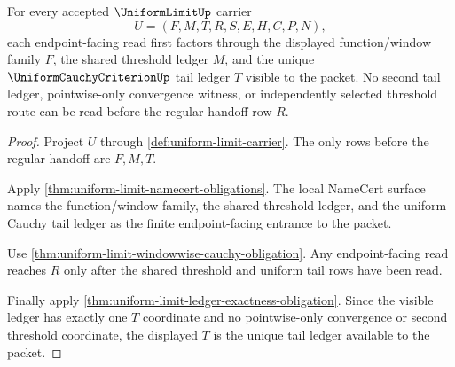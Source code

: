 \begin{theorem}
\label{thm:uniform-limit-tail-ledger-exactness}
For every accepted $\UniformLimitUp$ carrier
$$
U=(F,M,T,R,S,E,H,C,P,N),
$$
each endpoint-facing read first factors through the displayed function/window family $F$, the shared threshold ledger $M$, and the unique $\UniformCauchyCriterionUp$ tail ledger $T$ visible to the packet. No second tail ledger, pointwise-only convergence witness, or independently selected threshold route can be read before the regular handoff row $R$.
\end{theorem}
\begin{proof}
Project $U$ through \autoref{def:uniform-limit-carrier}. The only rows before the regular handoff are $F,M,T$.

Apply \autoref{thm:uniform-limit-namecert-obligations}. The local NameCert surface names the function/window family, the shared threshold ledger, and the uniform Cauchy tail ledger as the finite endpoint-facing entrance to the packet.

Use \autoref{thm:uniform-limit-windowwise-cauchy-obligation}. Any endpoint-facing read reaches $R$ only after the shared threshold and uniform tail rows have been read.

Finally apply \autoref{thm:uniform-limit-ledger-exactness-obligation}. Since the visible ledger has exactly one $T$ coordinate and no pointwise-only convergence or second threshold coordinate, the displayed $T$ is the unique tail ledger available to the packet.
\end{proof}

